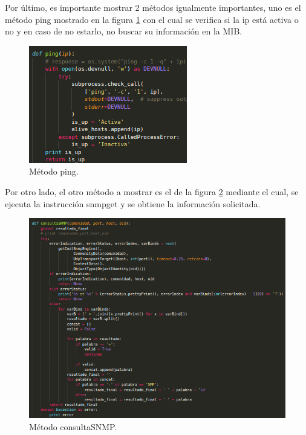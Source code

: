 Por último, es importante mostrar 2 métodos igualmente importantes, uno es el método ping mostrado en la figura \ref{image:ping} con el cual se verifica si la ip está activa o no y en caso de no estarlo, no buscar su información en la MIB.
\FloatBarrier
\begin{figure}[htbp!]
		\centering
	\includegraphics[width=.4 \textwidth]{images/ping_1}
		\caption{Método ping.}		\label{image:ping}
\end{figure}
\FloatBarrier
Por otro lado, el otro método a mostrar es el de la figura \ref{image:mib} mediante el cual, se ejecuta la instrucción snmpget y se obtiene la información solicitada.
\FloatBarrier
\begin{figure}[htbp!]
		\centering
	\includegraphics[width=.8 \textwidth]{images/mib}
		\caption{Método consultaSNMP.}		\label{image:mib}
\end{figure}
\FloatBarrier